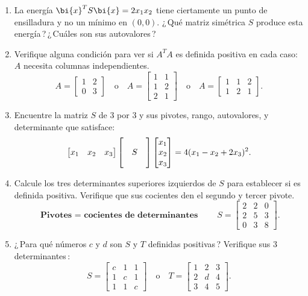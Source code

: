 \begin{enumerate}
\item La energía $\bi{x}^T S\bi{x}=2x_1x_2$ tiene ciertamente un punto de ensilladura y no un mínimo en $(0,0)$. ¿\,Qué matriz simétrica $S$ produce esta energía\,?\,¿\,Cuáles son sus autovalores\,?

\item Verifique alguna condición para ver si $A^T A$ es definida positiva en cada caso: $A$ necesita columnas independientes.
\[
A=\begin{bmatrix} 1&2\\ 0&3\end{bmatrix}\quad\text{o}\quad
A=\begin{bmatrix} 1&1\\ 1&2\\ 2&1\end{bmatrix} \quad\text{o}\quad
A=\begin{bmatrix} 1&1&2\\ 1&2&1\end{bmatrix}.
\]

\item Encuentre la matriz $S$ de $3$ por $3$ y sus pivotes, rango,
  autovalores, y determinante que satisface:
\[\begin{bmatrix} x_1 & x_2 & x_3\end{bmatrix}
     \begin{bmatrix}
       \vphantom{x_1}\\ \quad S\quad\vphantom{_1}\\
       \vphantom{x_1}\end{bmatrix}
       \begin{bmatrix} x_1\\
              x_2\\ x_3\end{bmatrix}
                =4(x_1-x_2+2x_3)^2.\]

\item Calcule los tres determinantes superiores izquierdos de $S$ para establecer si es definida positiva. Verifique que sus cocientes den el segundo y tercer pivote.
\[ \textbf{Pivotes $=$ cocientes de determinantes}\qquad
S=\begin{bmatrix} 2&2&0\\ 2&5&3\\ 0&3&8\end{bmatrix}.
\]

\item ¿\,Para qué números $c$ y $d$ son $S$ y $T$ definidas positivas\,?  Verifique sus $3$ determinantes\,:\linebreak
\[
S=\begin{bmatrix} c&1&1\\ 1&c&1\\ 1&1&c\end{bmatrix}\quad\text{o}\quad
T=\begin{bmatrix} 1&2&3\\ 2&d&4\\ 3&4&5\end{bmatrix}.
\]


\end{enumerate}
